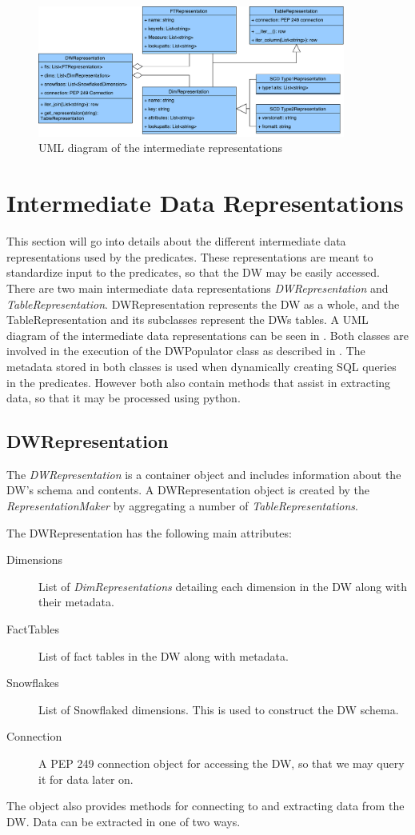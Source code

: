 \begin{figure}
\centering
\includegraphics[width=0.9\textwidth]{figures/dwrep_uml.pdf}
\caption{UML diagram of the intermediate representations}
\label{fig:dwrep}
\end{figure}

\section{Intermediate Data Representations}\label{sect:interdatarep}

This section will go into details about the different intermediate data representations used by the predicates. These representations are meant to standardize input to the predicates, so that the DW may be easily accessed. There are two main intermediate data representations \textit{DWRepresentation} and \textit{TableRepresentation}. DWRepresentation represents the DW as a whole, and the TableRepresentation and its subclasses represent the DWs tables. A UML diagram of the intermediate data representations can be seen in . Both classes are involved in the execution of the DWPopulator class as described in . The metadata stored in both classes is used when dynamically creating SQL queries in the predicates. However both also contain methods that assist in extracting data, so that it may be processed using python. 

\subsection{DWRepresentation}
The \textit{DWRepresentation} is a container object and includes information about the DW's schema and contents. A DWRepresentation object is created by the \textit{RepresentationMaker} by aggregating a number of \textit{TableRepresentations}.

The DWRepresentation has the following main attributes:

\begin{description}
\item[Dimensions] List of \textit{DimRepresentations} detailing each dimension in the DW along with their metadata.
\item[FactTables] List of fact tables in the DW along with metadata.
\item[Snowflakes] List of Snowflaked dimensions. This is used to construct the DW schema.
\item[Connection] A PEP 249 connection object for accessing the DW, so that we may query it for data later on.
\end{description}
The object also provides methods for connecting to and extracting data from the DW. Data can be extracted in one of two ways.

